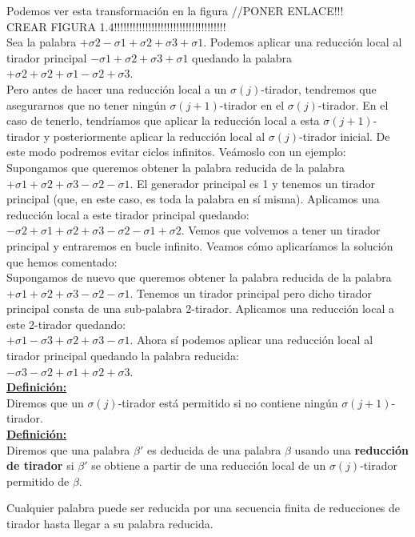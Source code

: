 \documentclass[14pt]{extarticle}
\begin{document}
Podemos ver esta transformación en la figura //PONER ENLACE!!!\\
CREAR FIGURA 1.4!!!!!!!!!!!!!!!!!!!!!!!!!!!!!!!!!!!!\\

Sea la palabra $+\sigma2-\sigma1+\sigma2+\sigma3+\sigma1$. Podemos aplicar una reducción local al tirador principal $-\sigma1+\sigma2+\sigma3+\sigma1$ quedando la palabra $+\sigma2+\sigma2+\sigma1-\sigma2+\sigma3$.\\

Pero antes de hacer una reducción local a un $\sigma(j)$-tirador, tendremos que asegurarnos que no tener ningún $\sigma(j+1)$-tirador en el $\sigma(j)$-tirador. En el caso de tenerlo, tendríamos que aplicar la reducción local a esta $\sigma(j+1)$-tirador y posteriormente aplicar la reducción local al $\sigma(j)$-tirador inicial. De este modo podremos evitar ciclos infinitos. Veámoslo con un ejemplo:\\

Supongamos que queremos obtener la palabra reducida de la palabra $+\sigma1+\sigma2+\sigma3-\sigma2-\sigma1$. El generador principal es 1 y tenemos un tirador principal (que, en este caso, es toda la palabra en sí misma). Aplicamos una reducción local a este tirador principal quedando: \\
$-\sigma2+\sigma1+\sigma2+\sigma3-\sigma2-\sigma1+\sigma2$.
Vemos que volvemos a tener un tirador principal y entraremos en bucle infinito. Veamos cómo aplicaríamos la solución que hemos comentado:\\

Supongamos de nuevo que queremos obtener la palabra reducida de la palabra $+\sigma1+\sigma2+\sigma3-\sigma2-\sigma1$. Tenemos un tirador principal pero dicho tirador principal consta de una sub-palabra 2-tirador. Aplicamos una reducción local a este 2-tirador quedando:\\
$+\sigma1-\sigma3+\sigma2+\sigma3-\sigma1$. Ahora sí podemos aplicar una reducción local al tirador principal quedando la palabra reducida: \\
$-\sigma3-\sigma2+\sigma1+\sigma2+\sigma3$.\\

\underline{\textbf{Definición:}} \\
Diremos que un  $\sigma(j)$-tirador está permitido si no contiene ningún $\sigma(j+1)$-tirador.\\

\underline{\textbf{Definición:}} \\
Diremos que una palabra $\beta'$ es deducida de una palabra $\beta$ usando una \textbf{reducción de tirador} si $\beta'$ se obtiene a partir de una reducción local de un $\sigma(j)$-tirador permitido de $\beta$.\\

\begin{teo}
	Cualquier palabra puede ser reducida por una secuencia finita de reducciones de tirador hasta llegar a su palabra reducida.
\end{teo}
\end{document}
